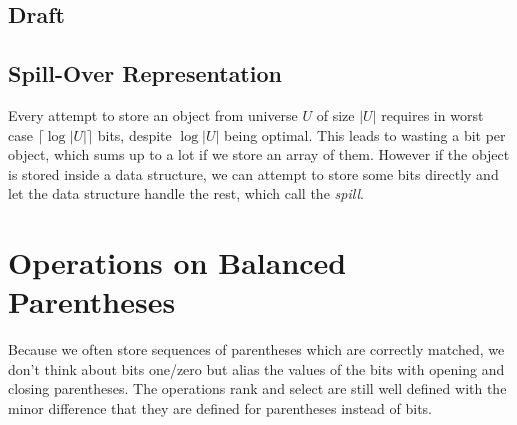 \subsection{Draft}



\subsection{Spill-Over Representation}

Every attempt to store an object from universe $U$ of size $|U|$ requires in worst case $\lceil \log |U| \rceil$ bits, despite $\log |U|$ being optimal.
This leads to wasting a bit per object, which sums up to a lot if we store an array of them.
However if the object is stored inside a data structure, we can attempt to store some bits directly and let the data structure handle the rest, which call the \emph{spill}.


\section{\label{s:op-bp}Operations on Balanced Parentheses}

Because we often store sequences of parentheses which are correctly matched, we don't think about bits one/zero but alias the values of the bits with opening and closing parentheses.
The operations rank and select are still well defined with the minor difference that they are defined for parentheses instead of bits.

